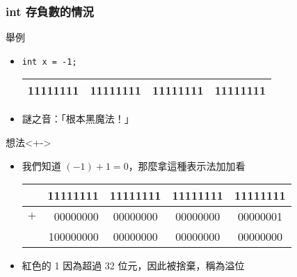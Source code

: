 \documentclass[utf8]{beamer}
\begin{document}
\begin{CJK}{UTF8}{bkai}
\begin{frame}[fragile]
  \frametitle{int 存負數的情況}
  \begin{exampleblock}{舉例}
    \begin{itemize}[<+->]
    \item \lstinline{int x = -1;}{}
      \begin{table}[h]
        \begin{tabular}{|c|c|c|c|}
        \hline
        \alert{1}1111111 & 11111111 & 11111111 & 11111111\\
        \hline
        \end{tabular}
      \end{table}
    \item 謎之音：「根本黑魔法！」
    \end{itemize}
  \end{exampleblock}
  \begin{block}{想法}<+->
    \begin{itemize}
    \item 我們知道 $(-1)+1=0$，那麼拿這種表示法加加看
      \begin{table}[h]
        \begin{tabular}{|c|r|c|c|c|}
        \hline
            &          11111111 & 11111111 & 11111111 & 11111111\\
        \hline
        $+$ &          00000000 & 00000000 & 00000000 & 00000001\\
        \hline
        \hline
            & \alert{1}00000000 & 00000000 & 00000000 & 00000000\\
        \hline
        \end{tabular}
      \end{table}
    \item<+-> 紅色的 \alert{1} 因為超過 32 位元，因此被捨棄，稱為\alert{溢位}
    \end{itemize}
  \end{block}
\end{frame}


\end{CJK}
\end{document}
